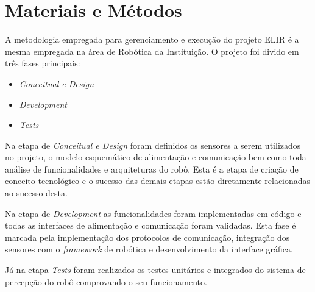 
\chapter{Materiais e Métodos}
\label{chap:mat}

A metodologia empregada para gerenciamento e execução do projeto ELIR é a mesma empregada na área de Robótica da Instituição. O projeto foi divido em três fases principais:

\begin{itemize}
	\item \textit{Conceitual e Design}
	\item \textit{Development}
	\item \textit{Tests}
\end{itemize}

Na etapa de \textit{Conceitual e Design} foram definidos os sensores a serem utilizados no projeto, o modelo esquemático de alimentação e comunicação bem como toda análise de funcionalidades e arquiteturas do robô. Esta é a etapa de criação de conceito tecnológico e o sucesso das demais etapas estão diretamente relacionadas ao sucesso desta.

Na etapa de \textit{Development} as funcionalidades foram implementadas em código e todas as interfaces de alimentação e comunicação foram validadas. Esta fase é marcada pela implementação dos protocolos de comunicação, integração dos sensores com o \textit{framework} de robótica e desenvolvimento da interface gráfica.

Já na etapa \textit{Tests} foram realizados os testes unitários e integrados do sistema de percepção do robô comprovando o seu funcionamento.


